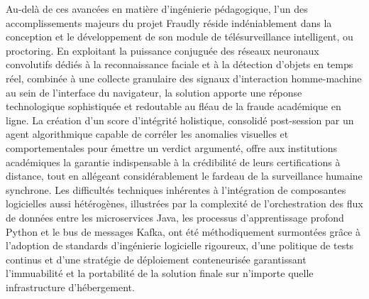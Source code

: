 Au-delà de ces avancées en matière d'ingénierie pédagogique, l'un des accomplissements majeurs du projet Fraudly réside indéniablement dans la conception et le développement de son module de télésurveillance intelligent, ou proctoring. En exploitant la puissance conjuguée des réseaux neuronaux convolutifs dédiés à la reconnaissance faciale et à la détection d'objets en temps réel, combinée à une collecte granulaire des signaux d'interaction homme-machine au sein de l'interface du navigateur, la solution apporte une réponse technologique sophistiquée et redoutable au fléau de la fraude académique en ligne. La création d'un score d'intégrité holistique, consolidé post-session par un agent algorithmique capable de corréler les anomalies visuelles et comportementales pour émettre un verdict argumenté, offre aux institutions académiques la garantie indispensable à la crédibilité de leurs certifications à distance, tout en allégeant considérablement le fardeau de la surveillance humaine synchrone. Les difficultés techniques inhérentes à l'intégration de composantes logicielles aussi hétérogènes, illustrées par la complexité de l'orchestration des flux de données entre les microservices Java, les processus d'apprentissage profond Python et le bus de messages Kafka, ont été méthodiquement surmontées grâce à l'adoption de standards d'ingénierie logicielle rigoureux, d'une politique de tests continus et d'une stratégie de déploiement conteneurisée garantissant l'immuabilité et la portabilité de la solution finale sur n'importe quelle infrastructure d'hébergement.

